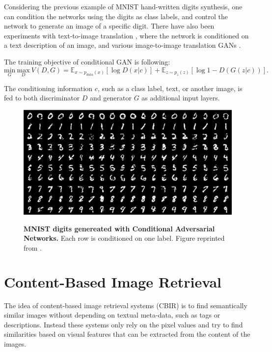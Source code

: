 \documentclass[12pt]{report}
\begin{document}
Considering the previous example of MNIST hand-written digits synthesis, one can condition the networks using the digits as class labels, and control the network to generate an image of a specific digit. There have also been experiments with text-to-image translation \cite{reed_generative_2016}, where the network is conditioned on a text description of an image, and various image-to-image translation GANs \cite{yoo_pixel-level_2016}\cite{yoo_pixel-level_2016}\cite{pathak_context_2016}.

The training objective of conditional GAN is following:
\begin{equation}
\underset{G}{\mathrm{min}} \ \underset{D}{\mathrm{max}} \ V(D,G) = \mathbb{E}_{x \sim p_{data}(x)}[\log D(x|c)] + \mathbb{E}_{z \sim p_{z}(z)}[\log 1 - D(G(z|c))].
\label{eq:cgan}
\end{equation}

The conditioning information $c$, such as a class label, text, or another image, is fed to both discriminator $D$ and generator $G$ as additional input layers.

\begin{figure}[h]
\centering
{\includegraphics[width=.8\linewidth]{02_background/mnist_cgan}}
\caption{\label{fig:cgan} \textbf{MNIST digits genereated with Conditional Adversarial Networks.} Each row is conditioned on one label. Figure reprinted from \cite{mirza_conditional_2014}.}
\end{figure}







\pagebreak
\section{Content-Based Image Retrieval}
The idea of content-based image retrieval systems (CBIR) is to find semantically similar images without depending on textual meta-data, such as tags or descriptions. Instead these systems only rely on the pixel values and try to find similarities based on visual features that can be extracted from the content of the images.
\end{document}

